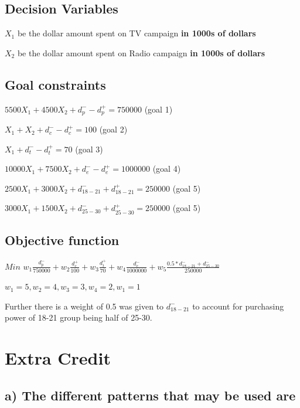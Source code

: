 \documentclass[]{article}
\begin{document}
\subsection{Decision Variables}\label{decision-variables-3}

\(X_{1}\) be the dollar amount spent on TV campaign \textbf{in 1000s of
dollars}

\(X_{2}\) be the dollar amount spent on Radio campaign \textbf{in 1000s
of dollars}

\subsection{Goal constraints}\label{goal-constraints}

\(5500X_{1} + 4500X_{2} + d_{p}^{-} - d_{p}^{+} = 750000\) (goal 1)

\(X_{1} + X_{2} + d_{c}^{-} - d_{c}^{+} = 100\) (goal 2)

\(X_{1} + d_{t}^{-} - d_{t}^{+} = 70\) (goal 3)

\(10000X_{1} + 7500X_{2} + d_{e}^{-}-d_{e}^{+}= 1000000\) (goal 4)

\(2500X_{1} + 3000X_{2} + d_{18-21}^{-} + d_{18-21}^{+} = 250000\) (goal
5)

\(3000X_{1} + 1500X_{2} + d_{25-30}^{-} + d_{25-30}^{+} = 250000\) (goal
5)

\subsection{Objective function}\label{objective-function-3}

\(Min\)
\(w_{1} \frac{d_{p}^{-}}{750000} + w_{2} \frac{d_{c}^{+}}{100} + w_{3}\frac{d_{t}^{+}}{70} + w_{4}\frac{d_{e}^{-}}{1000000} + w_{5}\frac{0.5*d_{18-21}^{-} + d_{25-30}^{-}}{250000}\)

\(w_{1} = 5, w_{2} = 4, w_{3} = 3, w_{4} = 2, w_{1} = 1\)

Further there is a weight of 0.5 was given to \(d_{18-21}^{-}\) to
account for purchasing power of 18-21 group being half of 25-30.

\section{Extra Credit}\label{extra-credit}

\subsection{a) The different patterns that may be used
are}\label{a-the-different-patterns-that-may-be-used-are}
\end{document}
